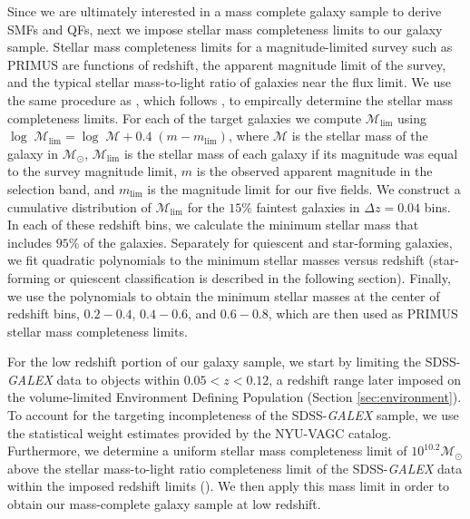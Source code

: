 \documentclass{emulateapj}
\begin{document}
Since we are ultimately interested in a mass complete galaxy sample to
derive SMFs and QFs, next we impose stellar mass completeness limits
to our galaxy sample.
Stellar mass completeness limits for a magnitude-limited survey such as PRIMUS are functions of redshift, the apparent magnitude limit of the survey, and the typical stellar mass-to-light ratio of galaxies near the flux limit. We use the same procedure as \cite{Moustakas:2013aa}, which follows \cite{Pozzetti:2010aa}, to empircally determine the stellar mass completeness limits. For each of the target galaxies we compute $\mathcal{M}_{\mathrm{lim}}$ using $\log \; \mathcal{M}_{\mathrm{lim}} = \log \; \mathcal{M} + 0.4\;(m - m_{\mathrm{lim}})$, where $\mathcal{M}$ is the stellar mass of the galaxy in $\mathcal{M_{\odot}}$, $\mathcal{M}_{\mathrm{lim}}$ is the stellar mass of each galaxy if its magnitude was equal to the survey magnitude limit, $m$ is the observed apparent magnitude in the selection band, and $m_{\mathrm{lim}}$ is the magnitude limit for our five fields. We construct a cumulative distribution of $\mathcal{M}_{\mathrm{lim}}$ for the $15\%$ faintest galaxies in $\Delta z=0.04$ bins. In each of these redshift bins, we calculate the minimum stellar mass that includes $95 \%$ of the galaxies. Separately for quiescent and star-forming galaxies, we fit quadratic polynomials to the minimum stellar masses versus redshift (star-forming or quiescent classification is described in the following section). Finally, we use the polynomials to obtain the minimum stellar masses at the center of redshift bins, $0.2-0.4$, $0.4-0.6$, and $0.6-0.8$, which are then used as PRIMUS stellar mass completeness limits.

For the low redshift portion of our galaxy sample, we start by limiting the SDSS-{\em GALEX} data to objects within $0.05 < z < 0.12$, a redshift range later imposed on the volume-limited Environment Defining Population (Section \ref{sec:environment}). To account for the targeting incompleteness of the SDSS-{\em GALEX} sample, we use the statistical weight estimates provided by the NYU-VAGC catalog. Furthermore, we determine a uniform stellar mass completeness limit of $10^{10.2} \mathcal{M}_{\odot}$ above the stellar mass-to-light ratio completeness limit of the SDSS-{\em GALEX} data within the imposed redshift limits (\citealt{Blanton:2005ab, Baldry:2008aa, Moustakas:2013aa}). We then apply this mass limit in order to obtain our mass-complete galaxy sample at low redshift. 
\end{document}
